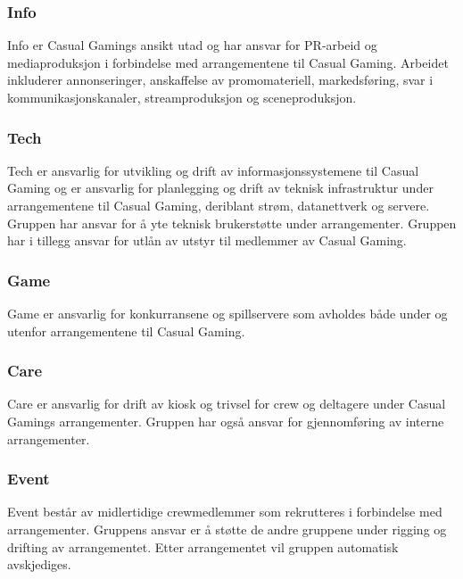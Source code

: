 \subsubsection{Info}
Info er Casual Gamings ansikt utad og har ansvar for PR-arbeid og mediaproduksjon i forbindelse med arrangementene til Casual Gaming. Arbeidet inkluderer annonseringer, anskaffelse av promomateriell, markedsføring, svar i kommunikasjonskanaler, streamproduksjon og sceneproduksjon.

\subsubsection{Tech}
Tech er ansvarlig for utvikling og drift av informasjonssystemene til Casual Gaming og er ansvarlig for planlegging og drift av teknisk infrastruktur under arrangementene til Casual Gaming, deriblant strøm, datanettverk og servere. Gruppen har ansvar for å yte teknisk brukerstøtte under arrangementer. Gruppen har i tillegg ansvar for utlån av utstyr til medlemmer av Casual Gaming.

\subsubsection{Game}
Game er ansvarlig for konkurransene og spillservere som avholdes både under og utenfor arrangementene til Casual Gaming.

\subsubsection{Care}
Care er ansvarlig for drift av kiosk og trivsel for crew og deltagere under Casual Gamings arrangementer. Gruppen har også ansvar for gjennomføring av interne arrangementer.

\subsubsection{Event}
Event består av midlertidige crewmedlemmer som rekrutteres i forbindelse med arrangementer. Gruppens ansvar er å støtte de andre gruppene under rigging og drifting av arrangementet. Etter arrangementet vil gruppen automatisk avskjediges.
